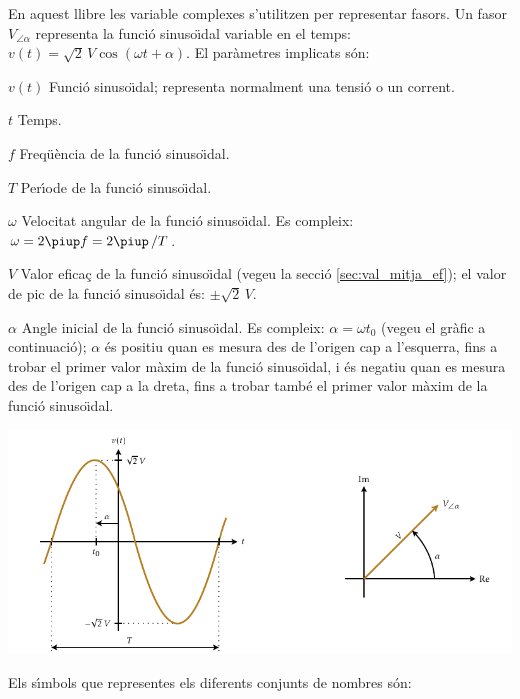 \pagebreak

En aquest llibre les variable complexes s'utilitzen per representar fasors. Un fasor $V_{\angle \alpha}$ representa la funci\'{o} sinuso\"{\i}dal variable en el temps: $v(t)=\sqrt{2}\, V \cos(\omega t + \alpha)$. El par\`{a}metres implicats s\'{o}n:
\begin{list}{}
{\setlength{\labelwidth}{15mm} \setlength{\leftmargin}{20mm}
\setlength{\labelsep}{5mm}}
    \item[$v(t)$] Funci\'{o} sinuso\"{\i}dal; representa normalment una tensi\'{o} o un corrent.
    \item[$t$] Temps.
    \item[$f$] Freq\"{u}\`{e}ncia de la funci\'{o} sinuso\"{\i}dal.
    \item[$T$] Per\'{\i}ode de la funci\'{o} sinuso\"{\i}dal.
    \item[$\omega$] Velocitat angular de la funci\'{o} sinuso\"{\i}dal. Es compleix: $\omega = 2 \piup f = 2 \piup\,/T$.
    \item[$V$] Valor efica\c{c} de la funci\'{o} sinuso\"{\i}dal (vegeu la secci\'{o} \vref{sec:val_mitja_ef}); el valor de pic de la funci\'{o} sinuso\"{\i}dal \'{e}s:  $\pm\sqrt{2}\, V$.
    \item[$\alpha$] Angle inicial de la funci\'{o} sinuso\"{\i}dal. Es compleix:  $\alpha=\omega t_0$ (vegeu el gr\`{a}fic a continuaci\'{o}); $\alpha$ \'{e}s positiu quan es mesura des de l'origen cap a l'esquerra, fins a trobar el primer valor m\`{a}xim de la funci\'{o} sinuso\"{\i}dal, i \'{e}s negatiu quan es mesura des de l'origen cap a la dreta, fins a trobar tamb\'{e} el primer valor m\`{a}xim de la funci\'{o} sinuso\"{\i}dal.
    \item[] \includegraphics{Imatges/Not-Fasor.pdf}
\end{list}

Els s\'{\i}mbols que representes els diferents conjunts de nombres s\'{o}n:

